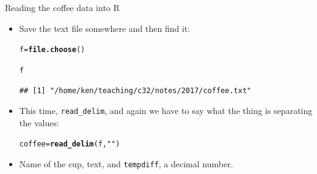 \documentclass[unknownkeysallowed]{beamer}\usepackage[]{graphicx}\usepackage[]{color}
\makeatletter
\newcommand{\hlstr}[1]{\textcolor[rgb]{0.192,0.494,0.8}{#1}}%
\newcommand{\hlstd}[1]{\textcolor[rgb]{0.345,0.345,0.345}{#1}}%
\newcommand{\hlkwb}[1]{\textcolor[rgb]{0.69,0.353,0.396}{#1}}%
\newcommand{\hlkwd}[1]{\textcolor[rgb]{0.737,0.353,0.396}{\textbf{#1}}}%
\newenvironment{kframe}{%
 \def\at@end@of@kframe{}%
 \ifinner\ifhmode%
  \def\at@end@of@kframe{\end{minipage}}%
  \begin{minipage}{\columnwidth}%
 \fi\fi%
 \def\FrameCommand##1{\hskip\@totalleftmargin \hskip-\fboxsep
 \colorbox{shadecolor}{##1}\hskip-\fboxsep
     \hskip-\linewidth \hskip-\@totalleftmargin \hskip\columnwidth}%
 \MakeFramed {\advance\hsize-\width
   \@totalleftmargin\z@ \linewidth\hsize
   \@setminipage}}%
 {\par\unskip\endMakeFramed%
 \at@end@of@kframe}
\newenvironment{knitrout}{}{} %
\makeatother
\begin{document}
\begin{frame}[fragile]{Reading the coffee data into R}
  
  \begin{itemize}
  \item Save the text file somewhere and then find it:

\begin{knitrout}
\color{fgcolor}\begin{kframe}
\begin{alltt}
\hlstd{f}\hlkwb{=}\hlkwd{file.choose}\hlstd{()}
\end{alltt}
\end{kframe}
\end{knitrout}
\begin{knitrout}
\color{fgcolor}\begin{kframe}
\begin{alltt}
\hlstd{f}
\end{alltt}
\begin{verbatim}
## [1] "/home/ken/teaching/c32/notes/2017/coffee.txt"
\end{verbatim}
\end{kframe}
\end{knitrout}
\item This time, \texttt{read\_delim}, and again we have to say what
  the thing is separating the values:
  
\begin{knitrout}
\color{fgcolor}\begin{kframe}
\begin{alltt}
\hlstd{coffee}\hlkwb{=}\hlkwd{read_delim}\hlstd{(f,}\hlstr{" "}\hlstd{)}
\end{alltt}


{\ttfamily\noindent\itshape\color{messagecolor}{\#\# Parsed with column specification:\\\#\# cols(\\\#\#\ \  cup = col\_character(),\\\#\#\ \  tempdiff = col\_double()\\\#\# )}}\end{kframe}
\end{knitrout}

\item Name of the cup, text, and \texttt{tempdiff}, a decimal number.
  \end{itemize}
  
\end{frame}
\end{document}
